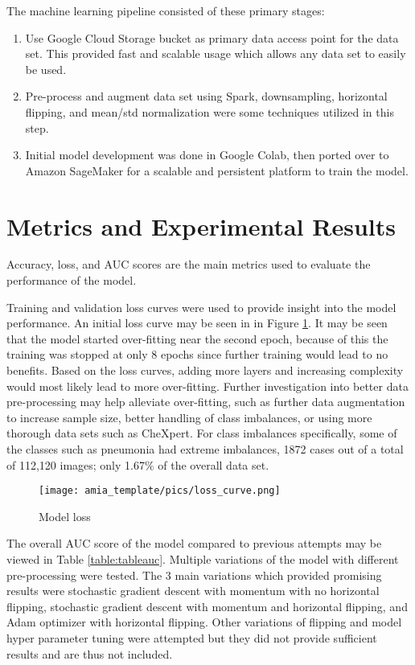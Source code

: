 \documentclass{amia}
\begin{document}
The machine learning pipeline consisted of these primary stages:
\begin{enumerate}
  \item Use Google Cloud Storage bucket as primary data access point for the data set. This provided fast and scalable usage which allows any data set to easily be used.
  \item Pre-process and augment data set using Spark, downsampling, horizontal flipping, and mean/std normalization were some techniques utilized in this step.
  \item Initial model development was done in Google Colab, then ported over to Amazon SageMaker for a scalable and persistent platform to train the model.
\end{enumerate}

\section*{Metrics and Experimental Results}
Accuracy, loss, and AUC scores are the main metrics used to evaluate the performance of the model.

Training and validation loss curves were used to provide insight into the model performance. An initial loss curve may be seen in in Figure \ref{figloss}. It may be seen that the model started over-fitting near the second epoch, because of this the training was stopped at only 8 epochs since further training would lead to no benefits. Based on the loss curves, adding more layers and increasing complexity would most likely lead to more over-fitting. Further investigation into better data pre-processing may help alleviate over-fitting, such as further data augmentation to increase sample size, better handling of class imbalances, or using more thorough data sets such as CheXpert. For class imbalances specifically, some of the classes such as pneumonia had extreme imbalances, 1872  cases  out  of  a total of 112,120 images;  only 1.67\% of the overall data set.

\begin{figure}[!htb]
\centering
\texttt{[image: amia\_template/pics/loss\_curve.png]}
\caption{Model loss}
\label{figloss}
\end{figure}

The overall AUC score of the model compared to previous attempts may be viewed in Table \ref{table:tableauc}. Multiple variations of the model with different pre-processing were tested. The 3 main variations which provided promising results were stochastic gradient descent with momentum with no horizontal flipping, stochastic gradient descent with momentum and horizontal flipping, and Adam optimizer with horizontal flipping. Other variations of flipping and model hyper parameter tuning were attempted but they did not provide sufficient results and are thus not included.
\end{document}
